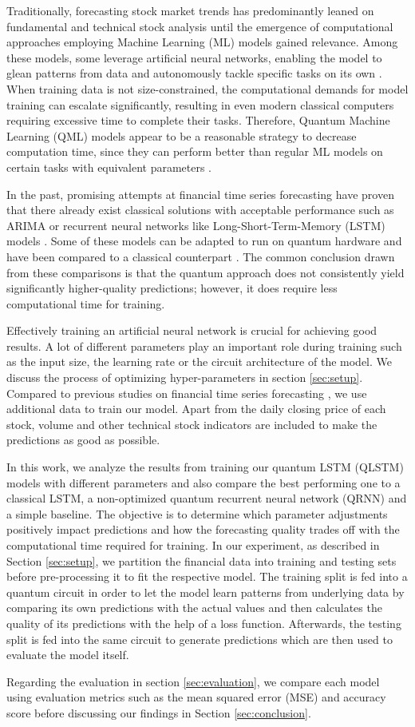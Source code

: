 Traditionally, forecasting stock market trends has predominantly leaned on fundamental and technical stock analysis until the emergence of computational approaches employing Machine Learning (ML) models gained relevance. Among these models, some leverage artificial neural networks, enabling the model to glean patterns from data and autonomously tackle specific tasks on its own \cite{Janiesch_2021}. When training data is not size-constrained, the computational demands for model training can escalate significantly, resulting in even modern classical computers requiring excessive time to complete their tasks. Therefore, Quantum Machine Learning (QML) models appear to be a reasonable strategy to decrease computation time, since they can perform better than regular ML models on certain tasks with equivalent parameters \cite{alcazar2020classical}. 

In the past, promising attempts at financial time series forecasting have proven that there already exist classical solutions with acceptable performance such as ARIMA or recurrent neural networks like Long-Short-Term-Memory (LSTM) models \cite{liu2023financial}. Some of these models can be adapted to run on quantum hardware \cite{chen2020quantum} and have been compared to a classical counterpart \cite{s2023potential}. The common conclusion drawn from these comparisons is that the quantum approach does not consistently yield significantly higher-quality predictions; however, it does require less computational time for training\cite{emmanoulopoulos2022quantum}. 

Effectively training an artificial neural network is crucial for achieving good results. A lot of different parameters play an important role during training such as the input size, the learning rate or the circuit architecture of the model. We discuss the process of optimizing hyper-parameters in section \ref{sec:setup}. Compared to previous studies on financial time series forecasting \cite{xu2023quantumenhanced}, we use additional data to train our model. Apart from the daily closing price of each stock, volume and other technical stock indicators are included to make the predictions as good as possible. 

In this work, we analyze the results from training our quantum LSTM (QLSTM) models with different parameters and also compare the best performing one to a classical LSTM, a non-optimized quantum recurrent neural network (QRNN) and a simple baseline. The objective is to determine which parameter adjustments positively impact predictions and how the forecasting quality trades off with the computational time required for training. In our experiment, as described in Section \ref{sec:setup}, we partition the financial data into training and testing sets before pre-processing it to fit the respective model. The training split is fed into a quantum circuit in order to let the model learn patterns from underlying data by comparing its own predictions with the actual values and then calculates the quality of its predictions with the help of a loss function. Afterwards, the testing split is fed into the same circuit to generate predictions which are then used to evaluate the model itself.


Regarding the evaluation in section \ref{sec:evaluation}, we compare each model using evaluation metrics such as the mean squared error (MSE) and accuracy score before discussing our findings in Section \ref{sec:conclusion}.







